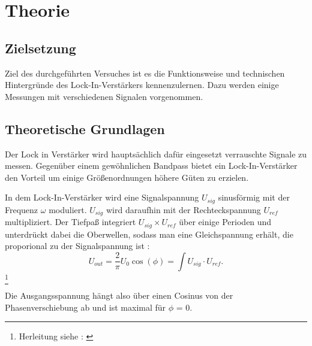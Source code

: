 \section{Theorie}
\label{sec:Theorie}
\subsection{Zielsetzung}
\label{sec:Zielsetzung}
Ziel des durchgeführten Versuches ist es die Funktionsweise und technischen
Hintergründe des Lock-In-Verstärkers kennenzulernen. Dazu werden einige
Messungen mit verschiedenen Signalen vorgenommen.

\subsection{Theoretische Grundlagen}
\label{sec:Grundlagen}
Der Lock in Verstärker wird hauptsächlich dafür eingesetzt verrauschte Signale
zu messen. Gegenüber einem gewöhnlichen Bandpass bietet ein Lock-In-Verstärker
den Vorteil um einige Größenordnungen höhere Güten zu erzielen.

In dem Lock-In-Verstärker wird eine
Signalspannung $U_{sig}$ sinusförmig
mit der Frequenz $\omega$
moduliert. $U_{sig}$ wird daraufhin mit der Rechteckspannung $U_{ref}$
multipliziert. 
Der Tiefpaß integriert $U_{sig} \times U_{ref}$ über einige Perioden und
unterdrückt dabei die Oberwellen, sodass man eine Gleichspannung erhält, die
proporional zu der Signalspannung
ist :
\begin{equation}
U_{out} = \frac{2}{\pi} U_0 \cos(\phi) = \int U_{sig} \cdot U_{ref}.
\label{eqn:Uout}
\end{equation}
\footnote{Herleitung siehe : \cite[1-3]{Anleitung}}


Die Ausgangsspannung hängt also über einen Cosinus
von der Phasenverschiebung ab und ist maximal
für $\phi$ = 0.
